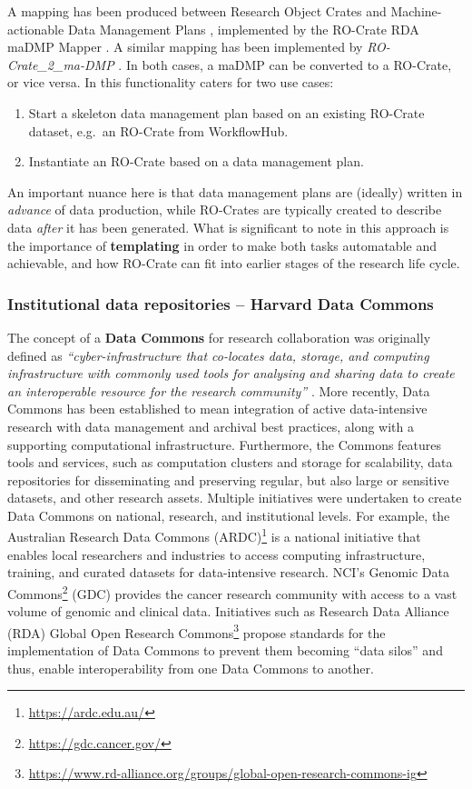 A mapping has been produced between Research Object Crates and
Machine-actionable Data Management Plans
\cite{Miksa 2020}, implemented by
the RO-Crate RDA maDMP Mapper
\cite{Arfaoui 2020}. A similar
mapping has been implemented by \emph{RO-Crate\_2\_ma-DMP}
\cite{Brenner 2020}. In both cases,
a maDMP can be converted to a RO-Crate, or vice versa. In
\cite{Miksa 2020} this
functionality caters for two use cases:

\begin{enumerate}
\item
  Start a skeleton data management plan based on an existing RO-Crate
  dataset, e.g.~an RO-Crate from WorkflowHub.
\item
  Instantiate an RO-Crate based on a data management plan.
\end{enumerate}

An important nuance here is that data management plans are (ideally)
written in \emph{advance} of data production, while RO-Crates are
typically created to describe data \emph{after} it has been generated.
What is significant to note in this approach is the importance of
\textbf{templating} in order to make both tasks automatable and
achievable, and how RO-Crate can fit into earlier stages of the research
life cycle.

\subsubsection{Institutional data repositories -- Harvard Data Commons}
\label{ch5:institutionalrepos}

The concept of a \textbf{Data Commons} for research collaboration was
originally defined as \emph{``cyber-infrastructure that co-locates data,
storage, and computing infrastructure with commonly used tools for
analysing and sharing data to create an interoperable resource for the
research community''}
\cite{ch5-59}. More recently,
Data Commons has been established to mean integration of active
data-intensive research with data management and archival best
practices, along with a supporting computational infrastructure.
Furthermore, the Commons features tools and services, such as
computation clusters and storage for scalability, data repositories for
disseminating and preserving regular, but also large or sensitive
datasets, and other research assets. Multiple initiatives were
undertaken to create Data Commons on national, research, and
institutional levels. For example, the Australian Research Data Commons
(ARDC)\footnote{\url{https://ardc.edu.au/}} 
\cite{Barker 2019} is a national
initiative that enables local researchers and industries to access
computing infrastructure, training, and curated datasets for
data-intensive research. NCI's Genomic
Data Commons\footnote{\url{https://gdc.cancer.gov/}} (GDC)
\cite{ch5-65} provides
the cancer research community with access to a vast volume of genomic
and clinical data. Initiatives such as
Research Data Alliance (RDA) Global Open Research Commons\footnote{\url{https://www.rd-alliance.org/groups/global-open-research-commons-ig}}
propose standards for
the implementation of Data Commons to prevent them becoming ``data
silos'' and thus, enable interoperability from one Data Commons to
another.

